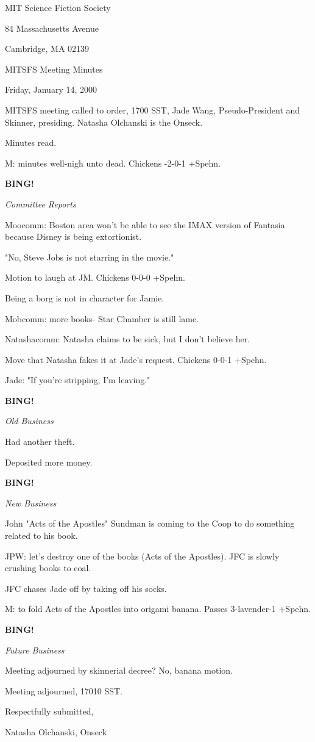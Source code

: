 \documentclass[12pt]{article}
\newcommand{\bing}{{\bf BING!} }
\newcommand{\goto}[1]{\bing \vskip 12pt \centerline{{\em{#1}}}}
\begin{document}
\begin{center}

MIT Science Fiction Society 

84 Massachusetts Avenue

Cambridge, MA 02139

\vspace{12pt}

MITSFS Meeting Minutes 

Friday, January 14, 2000

\end{center}
 
\vspace{18pt}

\setlength{\parskip}{6pt}

\noindent
MITSFS meeting called to order, 1700 SST, Jade Wang, Pseudo-President and
Skinner, presiding. Natasha Olchanski is the Onseck.

Minutes read.

M: minutes well-nigh unto dead. Chickens -2-0-1 +Spehn.

\goto{Committee Reports}

Moocomm: Boston area won't be able to see the IMAX version of Fantasia because Disney is being extortionist.

"No, Steve Jobs is not starring in the movie."

Motion to laugh at JM. Chickens 0-0-0 +Spehn.

Being a borg is not in character for Jamie.

Mobcomm: more books- Star Chamber is still lame.

Natashacomm: Natasha claims to be sick, but I don't believe her.

Move that Natasha fakes it at Jade's request. Chickens 0-0-1 +Spehn.

Jade: "If you're stripping, I'm leaving."

\goto{Old Business}

Had another theft.

Deposited more money.

\goto{New Business}

John "Acts of the Apostles" Sundman is coming to the Coop to do something related to his book.

JPW: let's destroy one of the books (Acts of the Apostles). JFC is slowly crushing books to coal.

JFC chases Jade off by taking off his socks.

M: to fold Acts of the Apostles into origami banana. Passes 3-lavender-1 +Spehn.

\goto{Future Business}

Meeting adjourned by skinnerial decree? No, banana motion.

\vspace{12pt}

\noindent
Meeting adjourned, 17010 SST.

\vspace{18pt}

\centerline{Respectfully submitted,}
\centerline{Natasha Olchanski, Onseck}
\end{document}
